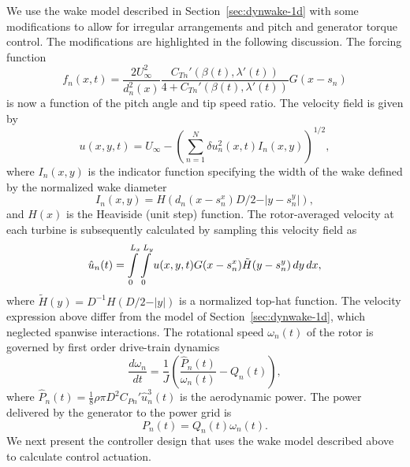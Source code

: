 We use the wake model described in Section~\ref{sec:dynwake-1d} with some modifications to allow for irregular arrangements and pitch and generator torque control. The modifications are highlighted in the following discussion. The forcing function
\begin{equation}
\label{eq:f}
f_n(x,t) = \frac{2 U_\infty^2 }{ d_n^2(x)} \frac{C_{Tn}'(\beta(t), \lambda'(t))}{4 + C_{Tn}'(\beta(t), \lambda'(t))} G(x-s_n)
\end{equation}
is now a function of the pitch angle and tip speed ratio. The velocity field is given by
\begin{equation}
u(x,y,t) = U_\infty - \left( \textstyle{\sum}_{n=1}^N \delta u^2_n(x,t) I_n(x,y) \right)^{1/2},
\end{equation}
where $I_n(x,y)$ is the indicator function specifying the width of the wake  defined by the normalized wake diameter
\begin{equation}
I_n(x,y) = H(d_n(x-s_n^x)D/2 - \vert y-s_n^y \vert),
\end{equation}
and $H(x)$ is the Heaviside (unit step) function. The rotor-averaged velocity at each turbine is subsequently calculated by sampling this velocity field as
\begin{equation}
\hat{u}_n(t) = \int\displaylimits_0^{\vphantom{L_y}L_x} \int\displaylimits_0^{L_y} u(x,y,t) G(x-s^x_n) \tilde{H}(y- s^y_n)\, dy \, dx,
\end{equation}
where $\tilde{H}(y) = D^{-1}H(D/2 - \vert y \vert)$ is a normalized top-hat function. The velocity expression above differ from the model of Section~\ref{sec:dynwake-1d}, which neglected spanwise interactions. The rotational speed $\omega_n(t)$ of the rotor is governed by first order drive-train dynamics~\cite{Pao2011a}
\begin{equation}
\label{eq:rotspeed}
\frac{d \omega_n}{dt} = \frac{1}{J}\left(  \frac{\hat{P}_n(t)}{\omega_n(t)} -Q_n(t) \right),
\end{equation}
where $\hat{P}_n(t) = \frac{1}{8}\rho \pi D^2 C_{Pn}'\hat{u}_n^3(t)$ is the aerodynamic power. The power delivered by the generator to the power grid is 
\begin{equation}
\label{eq:P}
P_n(t) = Q_n(t) \omega_n(t).
\end{equation}
We next present the controller design that uses the wake model described above to calculate control actuation.


